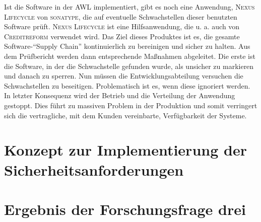 Ist die Software in der \ac{AWL} implementiert, gibt es noch eine Anwendung, \textsc{Nexus Lifecycle} von \textsc{sonatype}, die auf eventuelle Schwachstellen dieser benutzten Software prüft. \textsc{Nexus Lifecycle} ist eine Hilfsanwendung, die u. a. auch von \textsc{Creditreform} verwendet wird. Das Ziel dieses Produktes ist es, die gesamte Software-\enquote{Supply Chain} kontinuierlich zu bereinigen und sicher zu halten.\autocite[vgl.][]{sonatype_inc_nexus_2020} Aus dem Prüfbericht werden dann entsprechende Maßnahmen abgeleitet. Die erste ist die Software, in der die Schwachstelle gefunden wurde, als unsicher zu markieren und danach zu sperren. Nun müssen die Entwicklungsabteilung versuchen die Schwachstellen zu beseitigen. Problematisch ist es, wenn diese ignoriert werden. In letzter Konsequenz wird der Betrieb und die Verteilung der Anwendung gestoppt. Dies führt zu massiven Problem in der Produktion und somit verringert sich die vertragliche, mit dem Kunden vereinbarte, Verfügbarkeit der Systeme.

\section{Konzept zur Implementierung der Sicherheitsanforderungen}

\section{Ergebnis der Forschungsfrage drei}


